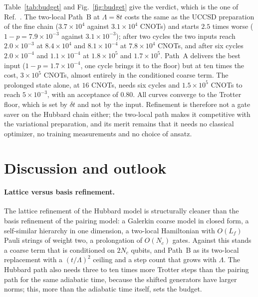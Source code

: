 \documentclass[
  aps,
  prc,
  reprint,
  superscriptaddress,
  floatfix,
  nofootinbib
]{revtex4-2}
\begin{document}
Table~\ref{tab:budget} and Fig.~\ref{fig:budget} give the verdict, which is
the one of Ref.~\cite{EigenQPairing2026}.  The two-local Path~B at
$\Lambda=8t$ costs the same as the UCCSD preparation of the fine chain
($3.7\times10^4$ against $3.1\times10^4$ CNOTs) and starts $2.5$ times worse
($1-p=7.9\times10^{-3}$ against $3.1\times10^{-3}$); after two cycles the two
inputs reach $2.0\times10^{-3}$ at $8.4\times10^4$ and $8.1\times10^{-4}$ at
$7.8\times10^4$ CNOTs, and after six cycles $2.0\times10^{-4}$ and
$1.1\times10^{-4}$ at $1.8\times10^5$ and $1.7\times10^5$.  Path~A delivers
the best input ($1-p=1.7\times10^{-4}$, one cycle brings it to the floor) but
at ten times the cost, $3\times10^5$ CNOTs, almost entirely in the
conditioned coarse term.  The prolonged state alone, at $16$ CNOTs, needs
six cycles and $1.5\times10^5$ CNOTs to reach $5\times10^{-3}$, with an
acceptance of $0.80$.  All curves converge to the Trotter floor, which is
set by $\delta t$ and not by the input.  Refinement is therefore not a gate
saver on the Hubbard chain either; the two-local path makes it competitive
with the variational preparation, and its merit remains that it needs no
classical optimizer, no training measurements and no choice of ansatz.

\section{Discussion and outlook}
\label{sec:discussion}
\paragraph{Lattice versus basis refinement.}
The lattice refinement of the Hubbard model is structurally cleaner than the
basis refinement of the pairing model: a Galerkin coarse model in closed
form, a self-similar hierarchy in one dimension, a two-local Hamiltonian
with $O(L_f)$ Pauli strings of weight two, a prolongation of $O(N_c)$ gates.
Against this stands a coarse term that is conditioned on $2N_c$ qubits, and
Path~B as its two-local replacement with a $(t/\Lambda)^2$ ceiling and a
step count that grows with $\Lambda$.  The Hubbard path also needs three to
ten times more Trotter steps than the pairing path for the same adiabatic
time, because the shifted generators have larger norms; this, more than the
adiabatic time itself, sets the budget.
\end{document}

